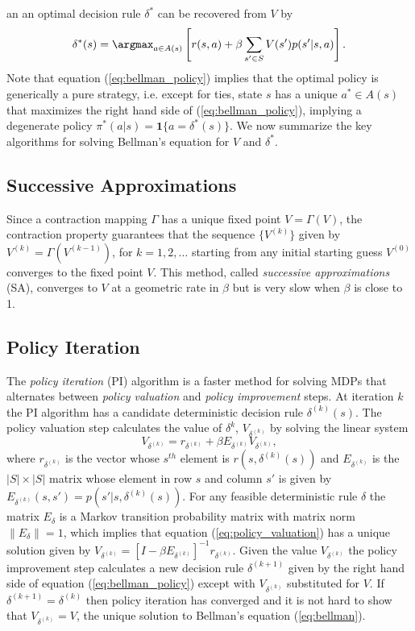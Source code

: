 an an optimal decision rule $\delta^*$ can be recovered from $V$ by
\begin{equation}
       \delta^*(s) = \argmax_{a \in A(s)}\left[ r(s,a)+\beta \sum_{s' \in S} V(s')p(s'|s,a)\right].
\label{eq:bellman_policy}
\end{equation}
Note that equation (\ref{eq:bellman_policy}) implies that the optimal policy is generically a pure strategy, i.e. except for
ties, state $s$ has a unique $a^* \in A(s)$ that maximizes the right hand side of (\ref{eq:bellman_policy}), 
implying a degenerate policy $\pi^*(a|s)=\mathbf{1}\{a=\delta^*(s)\}$. 
We now summarize the key algorithms for solving Bellman's equation 
for  $V$ and $\delta^*$.


\subsection{Successive Approximations}

Since a contraction mapping $\Gamma$ has a unique fixed point $V=\Gamma(V)$, the contraction property guarantees that 
the sequence $\{V^{(k)}\}$ given by $V^{(k)}=\Gamma(V^{(k-1)})$, for $k=1,2,\ldots$ starting from
any initial starting guess $V^{(0)}$ converges to the fixed point $V$. This method,  called 
{\it successive approximations\/} (SA), converges to $V$ at a geometric rate in $\beta$ but is very slow when $\beta$ is close to 1. 

\subsection{Policy Iteration}

The \citet{Howard:1960} {\it policy iteration\/} (PI) algorithm is a faster method for solving MDPs that 
alternates between {\it policy valuation\/} and {\it policy improvement\/} steps. At iteration $k$ the PI algorithm has a candidate
deterministic decision rule $\delta^{(k)}(s)$. The policy valuation step calculates the value of $\delta^k$,  $V_{\delta^{(k)}}$ by solving the linear system
\begin{equation}
     V_{\delta^{(k)}} = r_{\delta^{(k)}} + \beta E_{\delta^{(k)}} V_{\delta^{(k)}},
\label{eq:policy_valuation}
\end{equation}
where $r_{\delta^{(k)}}$ is the vector whose $s^{th}$ element is $r(s,\delta^{(k)}(s))$ and $E_{\delta^{(k)}}$ is the $|S| \times |S|$ matrix whose
element in row $s$ and column $s'$ is given by $E_{\delta^{(k)}}(s,s')=p(s'|s,\delta^{(k)}(s))$. For any feasible deterministic rule $\delta$
the matrix $E_{\delta}$ is a Markov transition probability matrix with matrix norm $\|E_{\delta}\|=1$, which implies that equation (\ref{eq:policy_valuation})
has a unique solution given by $V_{\delta^{(k)}}=[I-\beta E_{\delta^{(k)}}]^{-1} r_{\delta^{(k)}}.$ Given the value $V_{\delta^{(k)}}$ the  policy improvement step
calculates a new decision rule $\delta^{(k+1)}$ given by the right hand side of equation (\ref{eq:bellman_policy}) except with $V_{\delta^{(k)}}$ substituted for $V$. 
If $\delta^{(k+1)}=\delta^{(k)}$ then policy iteration has converged and it is not hard to show that $V_{\delta^{(k)}}=V$, the unique solution to Bellman's equation (\ref{eq:bellman}).  

